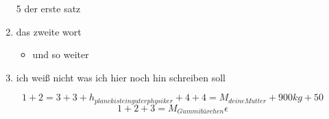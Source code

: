 \documentclass[a4paper]{scrartcl}
\begin{document}
		
		
		
		\begin{enumerate}
			\item[5] der erste satz
			\item das zweite wort 
			\begin{itemize}
			\item und so weiter
			\end{itemize}
			\item ich weiß nicht was ich hier noch hin schreiben soll
		\end{enumerate}
	
	 $$1+2=3+3+h_{planck ist ein guter physiker}+4+4=M_{deine Mutter}+900 {kg}+50$$
	 \begin{equation}
	 1+2+3=M_{Gummibärchen}
	  \epsilon
	 \end{equation}
\end{document}
